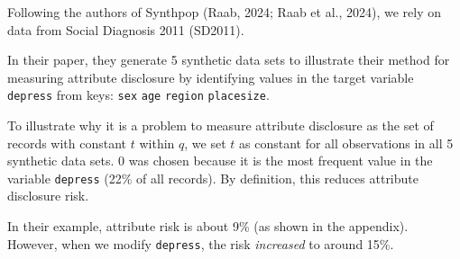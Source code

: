 \documentclass[t,8pt,utfx8]{beamer}
\begin{document}
\begin{spacing}{1.25}
{Following the authors of Synthpop (Raab, 2024; Raab et al., 2024), we rely on data from Social Diagnosis 2011 (SD2011).  

In their paper, they generate 5 synthetic data sets to illustrate their method for measuring attribute disclosure by identifying values in the target variable \texttt{depress} from keys: \texttt{sex} \texttt{age} \texttt{region} \texttt{placesize}.  

To illustrate why it is a problem to measure attribute disclosure as the set of records with constant $t$ within $q$, we set $t$ as constant for all observations in all 5 synthetic data sets.  0 was chosen because it is the most frequent value in the variable \texttt{depress} (22\% of all records).  By definition, this reduces attribute disclosure risk.  

In their example, attribute risk is about 9\% (as shown in the appendix).  
However, when we modify \texttt{depress}, the risk \emph{increased} to around 15\%.

}



\end{spacing}
\end{document}
